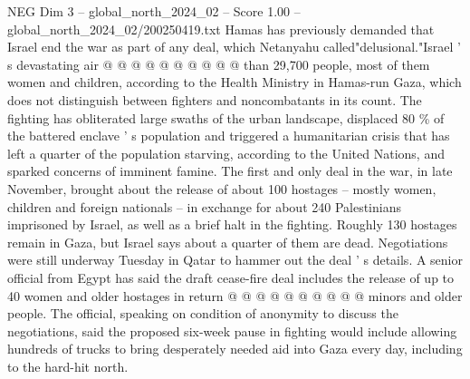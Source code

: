 \begin{textsample}{NEG Dim 3 – global\_north\_2024\_02 – Score 1.00 – global\_north\_2024\_02/200250419.txt}
Hamas has previously demanded that Israel end the war as part of any deal, which Netanyahu called"delusional."Israel ' s devastating air @ @ @ @ @ @ @ @ @ @ than 29,700 people, most of them women and children, according to the Health Ministry in Hamas-run Gaza, which does not distinguish between fighters and noncombatants in its count.
The fighting has obliterated large swaths of the urban landscape, displaced 80 \% of the battered enclave ' s population and triggered a humanitarian crisis that has left a quarter of the population starving, according to the United Nations, and sparked concerns of imminent famine.
The first and only deal in the war, in late November, brought about the release of about 100 hostages -- mostly women, children and foreign nationals -- in exchange for about 240 Palestinians imprisoned by Israel, as well as a brief halt in the fighting.
Roughly 130 hostages remain in Gaza, but Israel says about a quarter of them are dead.
Negotiations were still underway Tuesday in Qatar to hammer out the deal ' s details.
A senior official from Egypt has said the draft cease-fire deal includes the release of up to 40 women and older hostages in return @ @ @ @ @ @ @ @ @ @ minors and older people.
The official, speaking on condition of anonymity to discuss the negotiations, said the proposed six-week pause in fighting would include allowing hundreds of trucks to bring desperately needed aid into Gaza every day, including to the hard-hit north.

\end{textsample}
